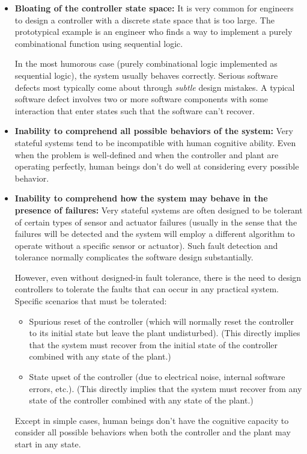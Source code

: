 \documentclass[letterpaper,10pt,titlepage]{article}
\begin{document}
\begin{itemize}
\item \textbf{Bloating of the controller state space:}
      \;It is very common for engineers to design a controller with
      a discrete state space that is too large.  The prototypical
      example is an engineer who finds a way to implement a purely combinational
      function using sequential logic.

      In the most humorous case (purely combinational logic implemented as
      sequential logic), 
      the system usually behaves correctly.  Serious software defects
      most typically come about through \emph{subtle} design mistakes.  A typical software defect
      involves two or more software components with some interaction that enter
      states such that the software can't recover.
\item \textbf{Inability to comprehend all possible behaviors of the system:}
      Very stateful systems tend to be incompatible with human cognitive
      ability.  Even when the problem is well-defined and when the controller and
      plant are operating perfectly, human beings don't do
      well at considering every possible behavior.
\item \textbf{Inability to comprehend how the system may behave in the presence
      of failures:}
      Very stateful systems are often designed to be tolerant of certain types
      of sensor and actuator failures (usually in the sense that the failures will
      be detected and the system will employ a different algorithm to operate without
      a specific sensor or actuator)\@.  Such fault detection and tolerance
      normally complicates the software design substantially.

      However, even without designed-in fault tolerance, there is the need to
      design controllers to tolerate the faults that can occur in any practical system.
      Specific scenarios that must be tolerated:

      \begin{itemize}
      \item Spurious reset of the controller (which will normally reset the controller
            to its initial state but leave the plant undisturbed).  (This directly implies that
            the system must recover from the initial state of the controller combined with
            any state of the plant.)
      \item State upset of the controller (due to electrical noise, internal software errors,
            etc.).  (This directly implies that the system must recover from any state of
            the controller combined with any state of the plant.)
      \end{itemize}

      Except in simple cases, human beings don't have the cognitive capacity to consider
      all possible behaviors when both the controller and the plant may start in any state.
\end{itemize}
\end{document}
